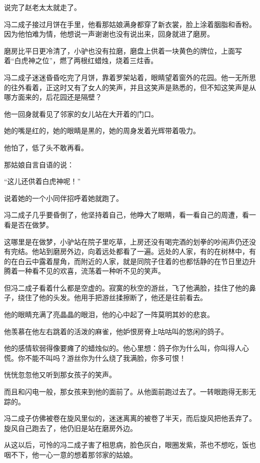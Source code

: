 \par 说完了赵老太太就走了。
\par 冯二成子接过月饼在手里，他看那姑娘满身都穿了新衣裳，脸上涂着胭脂和香粉。因为他怕难为情，他想说一声谢谢也没有说出来，回身就进了磨房。
\par 磨房比平日更冷清了，小驴也没有拉磨，磨盘上供着一块黄色的牌位，上面写着“白虎神之位”，燃了两根红蜡烛，烧着三炷香。
\par 冯二成子迷迷昏昏吃完了月饼，靠着罗架站着，眼睛望着窗外的花园。他一无所思的往外看着，正这时又有了女人的笑声，并且这笑声是熟悉的，但不知这笑声是从哪方面来的，后花园还是隔壁？
\par 他一回身就看见了邻家的女儿站在大开着的门口。
\par 她的嘴是红的，她的眼睛是黑的，她的周身发着光辉带着吸力。
\par 他怕了，低了头不敢再看。
\par 那姑娘自言自语的说：
\par “这儿还供着白虎神呢！”
\par 说着她的一个小同伴招呼着她就跑了。
\par 冯二成子几乎要昏倒了，他坚持着自己，他睁大了眼睛，看一看自己的周遭，看一看是否在做梦。
\par 这哪里是在做梦，小驴站在院子里吃草，上房还没有喝完酒的划拳的吵闹声仍还没有完结。他站到磨房外边，向着远处都看了一遍。远处的人家，有的在树林中，有的在白云中露着屋角，而附近的人家，就是同院子住着的也都恬静的在节日里边升腾着一种看不见的欢喜，流荡着一种听不见的笑声。
\par 但冯二成子看着什么都是空虚的。寂寞的秋空的游丝，飞了他满脸，挂住了他的鼻子，绕住了他的头发。他用手把游丝揉擦断了，他还是往前看去。
\par 他的眼睛充满了亮晶晶的眼泪，他的心中起了一阵莫明其妙的悲哀。
\par 他羡慕在他左右跳着的活泼的麻雀，他妒恨房脊上咕咕叫的悠闲的鸽子。
\par 他的感情软弱得像要瘫了的蜡烛似的。他心里想：鸽子你为什么叫，你叫得人心慌。你不能不叫吗？游丝你为什么绕了我满脸，你多可恨！
\par 恍恍忽忽他又听到那女孩子的笑声。
\par 而且和闪电一般，那女孩来到他的面前了。从他面前跑过去了。一转眼跑得无影无踪的。
\par 冯二成子仿佛被卷在旋风里似的，迷迷离离的被卷了半天，而后旋风把他丢弃了。旋风自己跑去了，他仍旧是站在磨房外边。
\par 从这以后，可怜的冯二成子害了相思病，脸色灰白，眼圈发紫，茶也不想吃，饭也咽不下，他一心一意的想着那邻家的姑娘。
